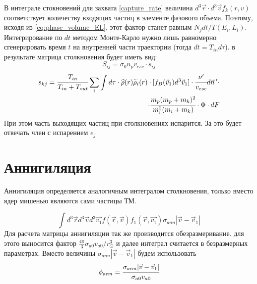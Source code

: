 В интеграле стокновений для захвата \ref{capture_rate} величина $d^{3}\vec{r} \cdot d^{3}\vec{v}f_{k}(r,v)$ соответствует количеству входящих частиц в элементе фазового объема. Поэтому, исходя из \ref{eq:phase_volume_EL}, этот фактор станет равным $N_{j}dt/T(E_i,L_i)$. Интегрирование по $dt$ методом Монте-Карло нужно лишь равномерно сгенерировать время $t$ на внутренней части траектории (тогда $dt = T_{in} d\tau$). в результате матрица столкновения будет иметь вид:
\begin{equation}
	\label{matrix_simple}
	S_{ij} = \sigma_{0} n_p v_{esc} \cdot s_{ij}
\end{equation}
\begin{equation}
	\begin{split}
	\label{st_nd}
	s_{kj} = \cfrac{T_{in}}{T_{in}+T_{out}} \sum_i \int d\tau \cdot \widehat{\rho}(r) \widetilde{\rho}_i(r) 
		\cdot[f_{B}(\vec{v}_1) d^3\vec{v}_1] \cdot 
		\cfrac{\nu'}{v_{esc}} d\vec{n}\,' \cdot \\
		\cdot \cfrac{m_{p} (m_p+m_k)^2}{m_i^2 ( m_i + m_k)}
		\cdot \Phi \cdot dF
	\end{split}
\end{equation}
При этом часть выходящих частиц при столкновениях испарится. За это будет отвечать член с испарением $e_j$

\section{Аннигиляция}
Аннигиляция определяется аналогичным интегралом столкновения, только вместо ядер мишенью являются сами частицы ТМ. 

\begin{equation}
	\label{eq:ann_st}
	\int{d^3\vec{r} d^3\vec{v}  d^3\vec{v_1} 
		f(\vec{r},\vec{v})f_1(\vec{r},\vec{v_1}) \sigma_{ann} 
		|\vec{v}-\vec{v}_1|}
\end{equation}
Для расчета матрицы аннигиляции так же производится обезразмеривание. для этого выносится фактор $\frac{4\pi}{3}\sigma_{a0}v_{a0}/r_{\odot}^3$ и далее интеграл считается в безразмерных параметрах. Вместо величины $ \sigma_{ann} 
|\vec{v}-\vec{v}_1|$ будем использовать 
\begin{equation}
	\phi_{ann} = \cfrac{\sigma_{ann} |\vec{v}-\vec{v}_1| }{\sigma_{a0}  v_{a0}}
\end{equation}

